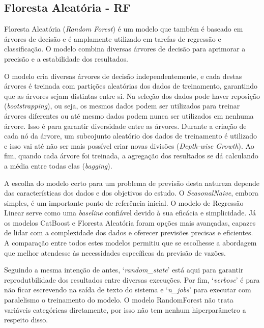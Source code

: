 
\subsection{Floresta Aleatória - RF}

Floresta Aleatória (\textit{Random Forest}) é um modelo que também é baseado em árvores de decisão e é amplamente utilizado em tarefas de regressão e classificação. O modelo combina diversas árvores de decisão para aprimorar a precisão e a estabilidade dos resultados.

O modelo cria diversas árvores de decisão independentemente, e cada destas árvores é treinada com partições aleatórias dos dados de treinamento, garantindo que as árvores sejam distintas entre si. Na seleção dos dados pode haver reposição (\textit{bootstrapping}), ou seja, os mesmos dados podem ser utilizados para treinar árvores diferentes ou até mesmo dados podem nunca ser utilizados em nenhuma árvore. Isso é para garantir diversidade entre as árvores. Durante a criação de cada nó da árvore, um subcojunto aleatório dos dados de treinamento é utilizado e isso vai até não ser mais possível criar novas divisões (\textit{Depth-wise Growth}). Ao fim, quando cada árvore foi treinada, a agregação dos resultados se dá calculando a média entre todas elas (\textit{bagging}).\cite{hasan_ahmed_salman_2024}\cite{sklearn_random_forest_2024}

A escolha do modelo certo para um problema de previsão desta natureza depende das características dos dados e dos objetivos do estudo. O \textit{SeasonalNaive}, embora simples, é um importante ponto de referência inicial. O modelo de Regressão Linear serve como uma \textit{baseline} confiável devido à sua eficácia e simplicidade. Já os modelos CatBoost e Floresta Aleatória foram opções mais avançadas, capazes de lidar com a complexidade dos dados e oferecer previsões precisas e eficientes. A comparação entre todos estes modelos permitiu que se escolhesse a abordagem que melhor atendesse às necessidades específicas da previsão de vazões.

Seguindo a mesma intenção de antes, `\textit{random\_state}' está aqui para garantir reprodutbilidade dos resultados entre diversas execuções. Por fim, `\textit{verbose}' é para não ficar escrevendo na saída de texto do sistema e `\textit{n\_jobs}' para executar com paralelismo o treinamento do modelo. O modelo RandomForest não trata variáveis categóricas diretamente, por isso não tem nenhum hiperparâmetro a respeito disso.

